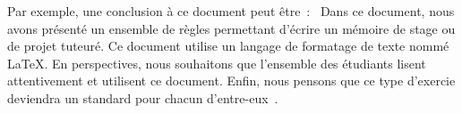 \documentclass[a4paper, 12pt]{book}
\begin{document}
Par exemple, une conclusion à ce document peut être~:
\guillemotleft{}~Dans ce document, nous avons présenté un ensemble de
règles permettant d'écrire un mémoire de stage ou de projet
tuteuré. Ce document utilise un langage de formatage de texte nommé
\LaTeX. En perspectives, nous souhaitons que l'ensemble des étudiants
lisent attentivement et utilisent ce document. Enfin, nous pensons que
ce type d'exercie deviendra un standard pour chacun
d'entre-eux~\guillemotright.



\end{document}
